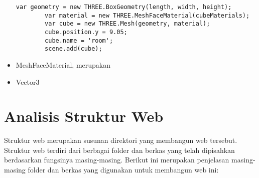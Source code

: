 \begin{itemize}
\begin{lstlisting}[caption={Contoh penggunaan {\it BoxGeometry} sebagai kelas yang akan ditambahkan ke {\it Scene} pada implementasi Aplikasi Pratinjau 3 Dimensi Berbasis Web}, label={lst:boxGeo},captionpos=b]
  	var geometry = new THREE.BoxGeometry(length, width, height);
        var material = new THREE.MeshFaceMaterial(cubeMaterials);
        var cube = new THREE.Mesh(geometry, material);
        cube.position.y = 9.05;
        cube.name = 'room';
        scene.add(cube);
\end{lstlisting}
	\item MeshFaceMaterial, merupakan 
	\item Vector3
\end{itemize}

\section{Analisis Struktur Web}
\label{sec:analisisStrukturWeb}

Struktur web merupakan susunan direktori yang membangun web tersebut. Struktur web terdiri dari berbagai folder dan berkas yang telah dipisahkan berdasarkan fungsinya masing-masing. Berikut ini merupakan penjelasan masing-masing folder dan berkas yang digunakan untuk membangun web ini:

